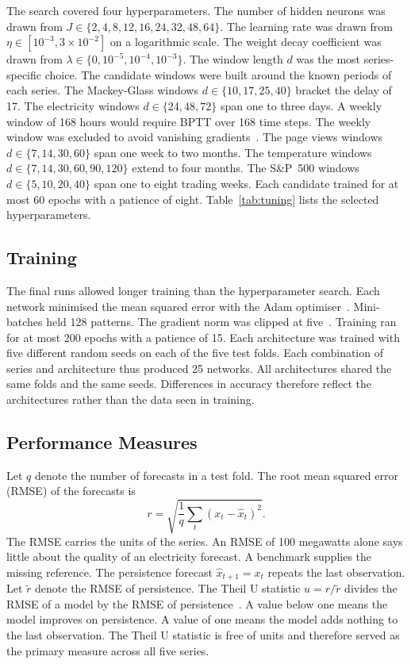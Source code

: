 \documentclass[conference,10pt]{IEEEtran}
\begin{document}
The search covered four hyperparameters.
The number of hidden neurons was drawn from
$J \in \{2, 4, 8, 12, 16, 24, 32, 48, 64\}$.
The learning rate was drawn from $\eta \in [10^{-3}, 3 \times 10^{-2}]$
on a logarithmic scale.
The weight decay coefficient was drawn from
$\lambda \in \{0, 10^{-5}, 10^{-4}, 10^{-3}\}$.
The window length $d$ was the most series-specific choice.
The candidate windows were built around the known periods of each
series.
The Mackey-Glass windows $d \in \{10, 17, 25, 40\}$ bracket the delay
of 17.
The electricity windows $d \in \{24, 48, 72\}$ span one to three days.
A weekly window of 168 hours would require BPTT over 168 time steps.
The weekly window was excluded to avoid vanishing
gradients~\cite{bengio1994}.
The page views windows $d \in \{7, 14, 30, 60\}$ span one week to two
months.
The temperature windows $d \in \{7, 14, 30, 60, 90, 120\}$ extend to
four months.
The S\&P~500 windows $d \in \{5, 10, 20, 40\}$ span one to eight
trading weeks.
Each candidate trained for at most 60 epochs with a patience of eight.
Table~\ref{tab:tuning} lists the selected hyperparameters.



\subsection{Training}

The final runs allowed longer training than the hyperparameter search.
Each network minimised the mean squared error with the Adam
optimiser~\cite{kingma2015}.
Mini-batches held 128 patterns.
The gradient norm was clipped at five~\cite{pascanu2013}.
Training ran for at most 200 epochs with a patience of 15.
Each architecture was trained with five different random seeds on each
of the five test folds.
Each combination of series and architecture thus produced 25 networks.
All architectures shared the same folds and the same seeds.
Differences in accuracy therefore reflect the architectures rather than
the data seen in training.

\subsection{Performance Measures}

Let $q$ denote the number of forecasts in a test fold.
The root mean squared error (RMSE) of the forecasts is
\begin{equation}
r = \sqrt{\frac{1}{q}\sum_{t} \left(x_t - \hat{x}_t\right)^2}.
\label{eq:rmse}
\end{equation}
The RMSE carries the units of the series.
An RMSE of 100 megawatts alone says little about the quality of an
electricity forecast.
A benchmark supplies the missing reference.
The persistence forecast $\hat{x}_{t+1} = x_t$ repeats the last
observation.
Let $\tilde{r}$ denote the RMSE of persistence.
The Theil U statistic $u = r / \tilde{r}$ divides the RMSE of a model by
the RMSE of persistence~\cite{theil1966}.
A value below one means the model improves on persistence.
A value of one means the model adds nothing to the last observation.
The Theil U statistic is free of units and therefore served as the
primary measure across all five series.
\end{document}
